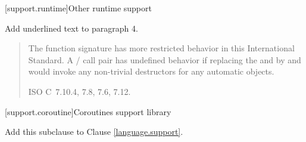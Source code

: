 \setcounter{section}{9}
[support.runtime]{Other runtime support}

Add underlined text to paragraph 4.

\begin{quote}
\setcounter{Paras}{3}
\pnum
The function signature
%
has more restricted behavior in this International Standard.
A / call pair has undefined
behavior if replacing the  and 
by  and  would invoke any non-trivial destructors for any automatic
objects.
%

\xref ISO C~7.10.4, 7.8, 7.6, 7.12.
\end{quote}

\setcounter{section}{10}
[support.coroutine]{Coroutines support library}

Add this subclause to Clause \ref{language.support}.


